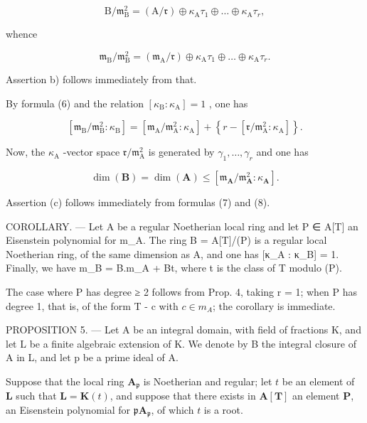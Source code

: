 \[
\mathrm{B} / \mathfrak {m} _ {\mathrm{B}} ^ {2} = (\mathrm{A} / \mathfrak {r}) \oplus \kappa_ {\mathrm{A}} \tau_ {1} \oplus \dots \oplus \kappa_ {\mathrm{A}} \tau_ {r},\tag{5}
\]

whence

\[
\mathfrak {m} _ {\mathrm{B}} / \mathfrak {m} _ {\mathrm{B}} ^ {2} = (\mathfrak {m} _ {\mathrm{A}} / \mathfrak {r}) \oplus \kappa_ {\mathrm{A}} \tau_ {1} \oplus \dots \oplus \kappa_ {\mathrm{A}} \tau_ {r}.\tag{6}
\]

Assertion b) follows immediately from that.

By formula (6) and the relation \([\kappa_{\mathrm{B}}:\kappa_{\mathrm{A}}] = 1\) , one has

\[
\left[ \mathfrak {m} _ {\mathrm{B}} / \mathfrak {m} _ {\mathrm{B}} ^ {2}: \kappa_ {\mathrm{B}} \right] = \left[ \mathfrak {m} _ {\mathrm{A}} / \mathfrak {m} _ {\mathrm{A}} ^ {2}: \kappa_ {\mathrm{A}} \right] + \left\{r - \left[ \mathfrak {r} / \mathfrak {m} _ {\mathrm{A}} ^ {2}: \kappa_ {\mathrm{A}} \right] \right\}.\tag{7}
\]

Now, the \(\kappa_{\mathrm{A}}\) -vector space \(\mathfrak{r}/\mathfrak{m}_{\mathrm{A}}^{2}\) is generated by \(\gamma_{1}, \ldots, \gamma_{r}\) and one has

\[
\dim (\mathbf {B}) = \dim (\mathbf {A}) \leqslant [ \mathfrak {m} _ {\mathbf {A}} / \mathfrak {m} _ {\mathbf {A}} ^ {2}: \kappa_ {\mathbf {A}} ].\tag{8}
\]

Assertion (c) follows immediately from formulas (7) and (8).

COROLLARY. --- Let A be a regular Noetherian local ring and let P ∈ A{[}T{]} an Eisenstein polynomial for m\_A. The ring B = A{[}T{]}/(P) is a regular local Noetherian ring, of the same dimension as A, and one has {[}κ\_A : κ\_B{]} = 1. Finally, we have m\_B = B.m\_A + Bt, where t is the class of T modulo (P).

The case where P has degree ≥ 2 follows from Prop. 4, taking r = 1; when P has degree 1, that is, of the form T - c with \(c \in m_{A}\); the corollary is immediate.

PROPOSITION 5. --- Let A be an integral domain, with field of fractions K, and let L be a finite algebraic extension of K. We denote by B the integral closure of A in L, and let p be a prime ideal of A.

Suppose that the local ring \(\mathbf{A}_{\mathfrak{p}}\) is Noetherian and regular; let \(t\) be an element of \(\mathbf{L}\) such that \(\mathbf{L} = \mathbf{K}(t)\), and suppose that there exists in \(\mathbf{A}[\mathbf{T}]\) an element \(\mathbf{P}\), an Eisenstein polynomial for \(\mathfrak{p}\mathbf{A}_{\mathfrak{p}}\), of which \(t\) is a root.

